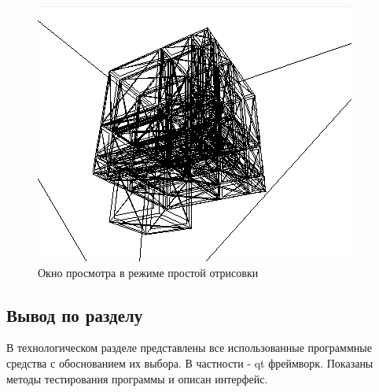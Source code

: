 \documentclass[a4paper, 14pt]{report}
\begin{document}
	\begin{figure}[ht]
		\centering
		\includegraphics[width=0.7\linewidth]{img/scene_carcass}
		\caption{Окно просмотра в режиме простой отрисовки}
		\label{fig:scenecarcass}
	\end{figure}
	
	\subsection{Вывод по разделу}
	В технологическом разделе представлены все использованные программные средства с обоснованием их выбора. В частности - qt фреймворк. Показаны методы тестирования программы и описан интерфейс.
	
	
	
\end{document}
